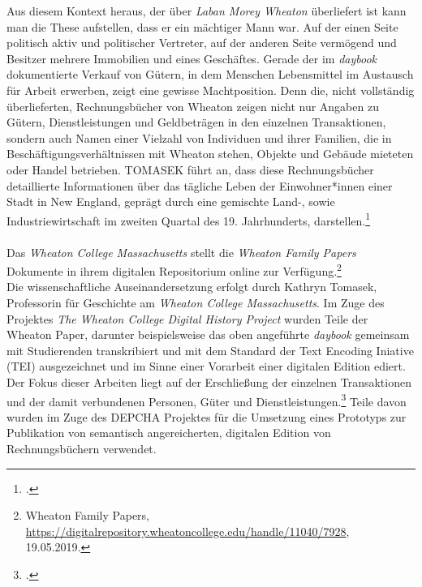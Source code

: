 \documentclass[12pt,a4paper]{article}
\begin{document}
Aus diesem Kontext heraus, der über \textit{Laban Morey Wheaton} überliefert ist kann man die These aufstellen, dass er ein mächtiger Mann war. Auf der einen Seite politisch aktiv und politischer Vertreter, auf der anderen Seite vermögend und Besitzer mehrere Immobilien und eines Geschäftes. Gerade der im \textit{daybook} dokumentierte Verkauf von Gütern, in dem Menschen Lebensmittel im Austausch für Arbeit erwerben, zeigt eine gewisse Machtposition. Denn die, nicht vollständig überlieferten, Rechnungsbücher von Wheaton zeigen nicht nur Angaben zu Gütern, Dienstleistungen und Geldbeträgen in den einzelnen Transaktionen, sondern auch Namen einer Vielzahl von Individuen und ihrer Familien, die in Beschäftigungsverhältnissen mit Wheaton stehen, Objekte und Gebäude mieteten oder Handel betrieben. TOMASEK führt an, dass diese Rechnungsbücher detaillierte Informationen über das tägliche Leben der Einwohner*innen einer Stadt in New England, geprägt durch eine gemischte Land-, sowie Industriewirtschaft im zweiten Quartal des 19. Jahrhunderts, darstellen.\footcite[][S.5]{tomasekmedea}
\\
\\
Das \textit{Wheaton College Massachusetts} stellt die \textit{Wheaton Family Papers} Dokumente in ihrem digitalen Repositorium online zur Verfügung.\footnote{Wheaton Family Papers, \url{https://digitalrepository.wheatoncollege.edu/handle/11040/7928}, 19.05.2019.} 
\\
Die wissenschaftliche Auseinandersetzung erfolgt durch Kathryn Tomasek, Professorin für Geschichte am \textit{Wheaton College Massachusetts}. Im Zuge des Projektes \textit{The Wheaton College Digital History Project} wurden Teile der Wheaton Paper, darunter beispielsweise das oben angeführte \textit{daybook} gemeinsam mit Studierenden transkribiert und mit dem Standard der Text Encoding Iniative (TEI) ausgezeichnet und im Sinne einer Vorarbeit einer digitalen Edition ediert. Der Fokus dieser Arbeiten liegt auf der Erschließung der einzelnen Transaktionen und der damit verbundenen Personen, Güter und Dienstleistungen.\footcite[Vgl. TOMASEK Kathryn: The Wheaton College Digital History Project: Undergraduate Research in a Local Collection, \protect\url{https://writinghistory.trincoll.edu/teach/wheaton-college-digital-history-project-tomasek/}, 23.05.2019.][S.379]{alexander2012should} Teile davon wurden im Zuge des DEPCHA Projektes für die Umsetzung eines Prototyps zur Publikation von semantisch angereicherten, digitalen Edition von Rechnungsbüchern verwendet.
\\
\end{document}
